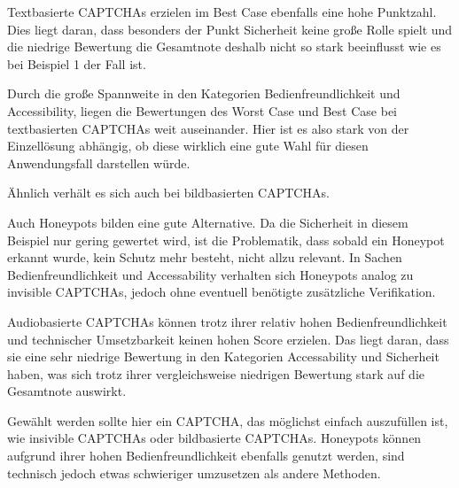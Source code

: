 Textbasierte CAPTCHAs erzielen im Best Case ebenfalls eine hohe Punktzahl. 
Dies liegt daran, dass besonders der Punkt Sicherheit keine große Rolle spielt
und die niedrige Bewertung die Gesamtnote deshalb nicht so stark beeinflusst wie es bei Beispiel 1 der Fall ist. 

Durch die große Spannweite in den Kategorien Bedienfreundlichkeit und Accessibility, 
liegen die Bewertungen des Worst Case und Best Case bei textbasierten CAPTCHAs weit auseinander.
Hier ist es also stark von der Einzellösung abhängig, ob diese wirklich eine gute Wahl für diesen Anwendungsfall darstellen würde.

Ähnlich verhält es sich auch bei bildbasierten CAPTCHAs. 

Auch Honeypots bilden eine gute Alternative. 
Da die Sicherheit in diesem Beispiel nur gering gewertet wird, ist die Problematik, dass sobald ein Honeypot erkannt wurde,
kein Schutz mehr besteht, nicht allzu relevant. 
In Sachen Bedienfreundlichkeit und Accessability verhalten sich Honeypots analog zu invisible CAPTCHAs,
jedoch ohne eventuell benötigte zusätzliche Verifikation.

Audiobasierte CAPTCHAs können trotz ihrer relativ hohen Bedienfreundlichkeit und technischer Umsetzbarkeit keinen hohen Score erzielen.
Das liegt daran, dass sie eine sehr niedrige Bewertung in den Kategorien Accessability und Sicherheit haben,
was sich trotz ihrer vergleichsweise niedrigen Bewertung stark auf die Gesamtnote auswirkt.

Gewählt werden sollte hier ein CAPTCHA, das möglichst einfach auszufüllen ist, wie insivible CAPTCHAs oder bildbasierte CAPTCHAs. 
Honeypots können aufgrund ihrer hohen Bedienfreundlichkeit ebenfalls genutzt werden, 
sind technisch jedoch etwas schwieriger umzusetzen als andere Methoden.
